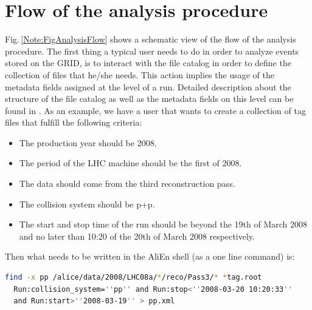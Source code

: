 \section{Flow of the analysis procedure}
\label{Note:FLOW}

Fig.\,\ref{Note:FigAnalysisFlow} shows a schematic view of the flow of the analysis procedure. The first thing a typical user needs to do in order to analyze events stored on the GRID, is to interact with the file catalog in order to define the collection of files that he/she needs. This action implies the usage of the metadata fields assigned at the level of a run. Detailed description about the structure of the file catalog as well as the metadata fields on this level can be found in \cite{Note:RefFileCatalogMetadataNote,Note:RefFileCatalogMetadataWeb}. As an example, we have a user that wants to create a collection of tag files that fulfill the following criteria:

\begin{itemize}
\item The production year should be 2008.
\item The period of the LHC machine should be the first of 2008.
\item The data should come from the third reconstruction pass.
\item The collision system should be p+p.
\item The start and stop time of the run should be beyond the 19th of March 2008 and no later than 10:20 of the 20th of March 2008 respectively.
\end{itemize}

\noindent Then what needs to be written in the AliEn shell \cite{Note:RefFileCatalogMetadataWeb} (as a one line command) is:

\begin{lstlisting}[language=sh]
  find -x pp /alice/data/2008/LHC08a/*/reco/Pass3/* *tag.root 
  Run:collision_system=''pp'' and Run:stop<''2008-03-20 10:20:33'' 
  and Run:start>''2008-03-19'' > pp.xml
\end{lstlisting}

